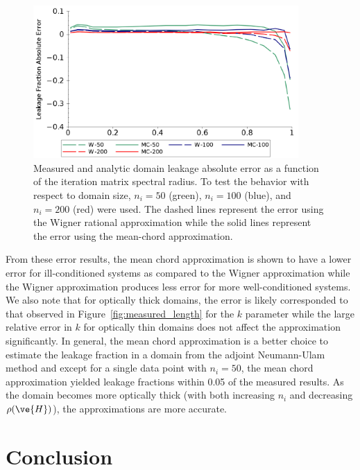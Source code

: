 \documentclass[preprint,11pt]{elsarticle}
\begin{document}
\begin{figure}[ht!]
  \begin{center}
    \includegraphics[width=0.9\textwidth]{leakage_error.png}
  \end{center}
  \caption{Measured and analytic domain leakage absolute error as a
    function of the iteration matrix spectral radius.  To test the
    behavior with respect to domain size, $n_i=50$ (green),
    $n_i=100$ (blue), and $n_i=200$ (red) were used. The dashed
    lines represent the error using the Wigner rational
    approximation while the solid lines represent the error using
    the mean-chord approximation.}
  \label{fig:leakage_error}
\end{figure}
From these error results, the mean chord approximation is shown to have a
lower error for ill-conditioned systems as compared to the Wigner
approximation while the Wigner approximation produces less error for more
well-conditioned systems. We also note that for optically thick domains, the
error is likely corresponded to that observed in
Figure~\ref{fig:measured_length} for the $k$ parameter while the large
relative error in $k$ for optically thin domains does not affect the
approximation significantly. In general, the mean chord approximation is a
better choice to estimate the leakage fraction in a domain from the adjoint
Neumann-Ulam method and except for a single data point with $n_i=50$, the mean
chord approximation yielded leakage fractions within 0.05 of the measured
results. As the domain becomes more optically thick (with both increasing
$n_i$ and decreasing $\rho(\ve{H})$), the approximations are more accurate.

\section{Conclusion}
\end{document}
